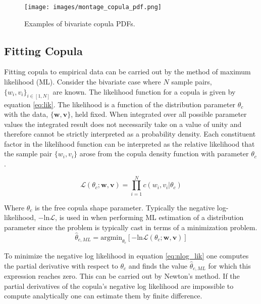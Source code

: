 \begin{figure}[!htbp]
	\centering
	\texttt{[image: images/montage\_copula\_pdf.png]}
	\caption{Examples of bivariate copula PDFs.}
	\label{fig:montage_cop}
\end{figure}

\subsection{Fitting Copula}
\label{sec:fitting_copula}

Fitting copula to empirical data can be carried out by the method of maximum likelihood (ML).  Consider the bivariate case where $N$ sample pairs, $\{w_i, v_i\}_{i\in [ 1,N ] }$  are known. The likelihood function for a copula is given by equation \ref{eq:lik}.  The likelihood is a function of the distribution parameter $\theta_c$ with the data, $\{\mathbf w,\mathbf v \}$, held fixed. When integrated over all possible parameter values the integrated result does not necessarily take on a value of unity and therefore cannot be strictly interpreted as a probability density. Each constituent factor in the likelihood function can be interpreted as the relative likelihood that the sample pair $\{w_i, v_i\}$ arose from the copula density function with parameter $\theta_c$.

\begin{equation}
    \mathcal{L}(\theta_c;\mathbf w,\mathbf v)= \prod_{i=1}^N c(w_i, v_i|\theta_c)
\label{eq:lik}
\end{equation}

Where $\theta_c$ is the free copula shape parameter.
Typically the negative log-likelihood, $-\mathrm{ln}\mathcal{L}$, is used in when performing ML estimation of a distribution parameter since the problem is typically cast in terms of a minimization problem.  
\begin{equation}
\hat \theta_{c,ML} = \mathrm{argmin}_{\theta_c}[-\mathrm{ln}\mathcal{L}(\theta_{c} ; \mathbf w, \mathbf v)]
\label{eq:nlog_lik}
\end{equation}

To minimize the negative log likelihood in equation \ref{eq:nlog_lik}  one computes the partial derivative with respect to $\theta_c$ and finds the value $\hat \theta_{c,ML}$ for which this expression reaches zero.  This can be carried out by Newton's method.  If the partial derivatives of the copula's negative log likelihood are impossible to compute analytically one can estimate them by finite difference.

